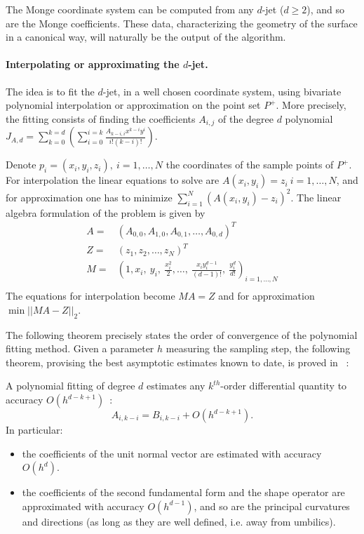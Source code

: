 The Monge coordinate system can be computed from any $d$-jet ($d\geq
2$), and so are the Monge coefficients. These data, characterizing the
geometry of the surface in a canonical way, will naturally be the
output of the algorithm.

\paragraph{Interpolating or approximating the $d$-jet.}
%
The idea is to fit the $d$-jet, in a well chosen coordinate system,
using bivariate polynomial interpolation or approximation on the point
set $P^+$.
%
More precisely, the fitting consists of finding the coefficients
$A_{i,j}$ of the degree $d$ polynomial $J_{A,d}=
\sum_{k=0}^{k=d}(\sum_{i=0}^{i=k}
\frac{A_{k-i,i}x^{k-i}y^{i}}{i!(k-i)!})$.


Denote $p_i=(x_i,y_i,z_i), \ i=1,\ldots , N$ the coordinates of the
sample points of $P^+$.
For interpolation the linear equations to solve are $A(x_i,y_i)=z_i \
i=1,\ldots,N$, and for approximation one has to minimize $\sum_{i=1}^N
(A(x_i,y_i)-z_i)^2$. The linear algebra formulation of the problem is
given by
%
\begin{eqnarray*}
 A =  & (A_{0,0}, A_{1,0},A_{0,1}, \ldots , A_{0,d})^T \\ 
 Z=  &(z_1, z_2,\ldots , z_N)^T \\ 
 M=  &(1,x_i,\ y_i,\ \frac{x_i^2}{2},\ldots ,
\ \frac{x_iy_i^{d-1}}{(d-1)!},\ \frac{y_i^d}{d!})_{i=1,...,N}\\
\end{eqnarray*}
%
The equations for interpolation become $MA=Z$ and for approximation
$\min ||MA-Z||_2$.


The following theorem precisely states the order of convergence of the
polynomial fitting method.  Given a parameter $h$ measuring the
sampling step, the following theorem, provising the best asymptotic
estimates known to date, is proved in \cite{fc-mp-edqpfoj-05}~:
\begin{theorem}
A polynomial fitting of degree $d$ estimates any $k^{th}$-order
differential quantity to accuracy $O(h^{d-k+1})$~:
\begin{equation}
A_{i,k-i} = B_{i,k-i} +O(h^{d-k+1}).
\end{equation}
%
In particular:
\begin{itemize}
\item 
the coefficients of the unit normal vector are estimated with accuracy
$O(h^d)$.
\item 
the coefficients of the second fundamental form and the shape 
operator are approximated with accuracy $O(h^{d-1})$, and so are the
principal curvatures and directions (as long as they are well defined,
i.e. away from umbilics).
\end{itemize}
\end{theorem}

